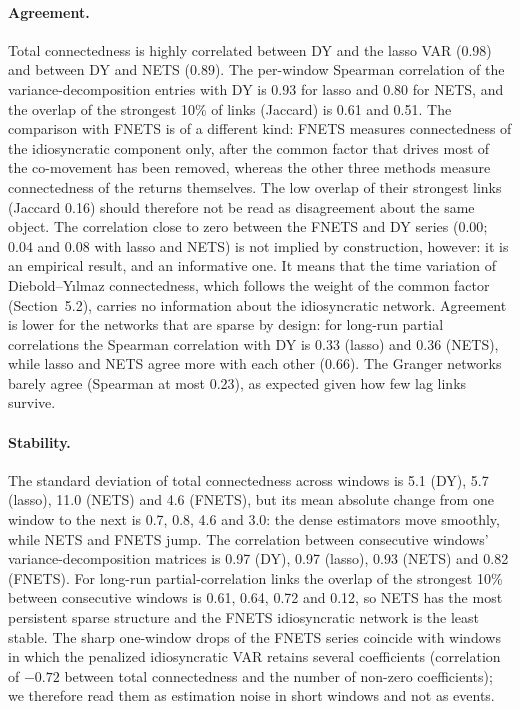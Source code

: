 \paragraph{Agreement.} Total connectedness is highly correlated between DY and the lasso VAR (0.98) and between DY and NETS (0.89). The per-window Spearman correlation of the variance-decomposition entries with DY is 0.93 for lasso and 0.80 for NETS, and the overlap of the strongest 10\% of links (Jaccard) is 0.61 and 0.51. The comparison with FNETS is of a different kind: FNETS measures connectedness of the idiosyncratic component only, after the common factor that drives most of the co-movement has been removed, whereas the other three methods measure connectedness of the returns themselves. The low overlap of their strongest links (Jaccard 0.16) should therefore not be read as disagreement about the same object. The correlation close to zero between the FNETS and DY series ($0.00$; $0.04$ and $0.08$ with lasso and NETS) is not implied by construction, however: it is an empirical result, and an informative one. It means that the time variation of Diebold--Y{\i}lmaz connectedness, which follows the weight of the common factor (Section~5.2), carries no information about the idiosyncratic network. Agreement is lower for the networks that are sparse by design: for long-run partial correlations the Spearman correlation with DY is 0.33 (lasso) and 0.36 (NETS), while lasso and NETS agree more with each other (0.66). The Granger networks barely agree (Spearman at most 0.23), as expected given how few lag links survive.

\paragraph{Stability.} The standard deviation of total connectedness across windows is 5.1 (DY), 5.7 (lasso), 11.0 (NETS) and 4.6 (FNETS), but its mean absolute change from one window to the next is 0.7, 0.8, 4.6 and 3.0: the dense estimators move smoothly, while NETS and FNETS jump. The correlation between consecutive windows' variance-decomposition matrices is 0.97 (DY), 0.97 (lasso), 0.93 (NETS) and 0.82 (FNETS). For long-run partial-correlation links the overlap of the strongest 10\% between consecutive windows is 0.61, 0.64, 0.72 and 0.12, so NETS has the most persistent sparse structure and the FNETS idiosyncratic network is the least stable. The sharp one-window drops of the FNETS series coincide with windows in which the penalized idiosyncratic VAR retains several coefficients (correlation of $-0.72$ between total connectedness and the number of non-zero coefficients); we therefore read them as estimation noise in short windows and not as events.

